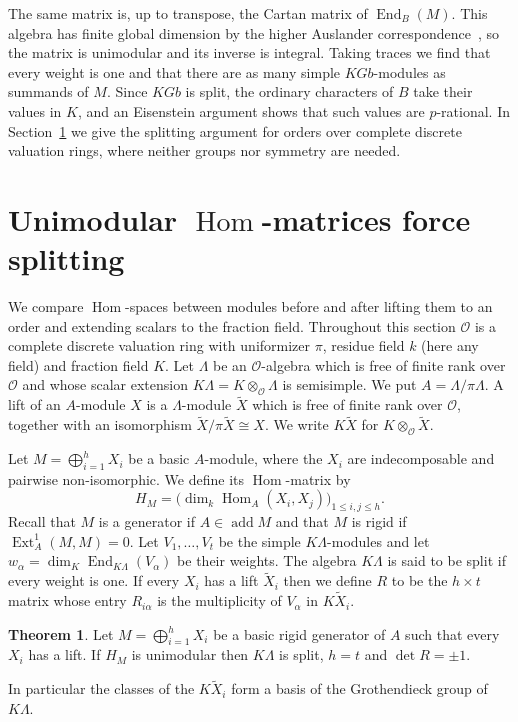 \documentclass[11pt,a4paper,reqno]{amsart}
\newcommand{\kk}{k}
\theoremstyle{definition}
\newtheorem{theorem}{Theorem}
\DeclareMathOperator{\Hom}{Hom}
\DeclareMathOperator{\End}{End}
\DeclareMathOperator{\Ext}{Ext}
\DeclareMathOperator{\add}{add}
\newcommand{\OO}{\mathcal O}
\begin{document}
The same matrix is, up to transpose, the Cartan matrix of
$\End_{B}(M)$.  This algebra has finite global dimension by the higher
Auslander correspondence~\cite{IyamaAC}, so the matrix is unimodular
and its inverse is integral.  Taking traces we find that every weight
is one and that there are as many simple $KGb$-modules as summands of
$M$.  Since $KGb$ is split, the ordinary characters of $B$ take their
values in $K$, and an Eisenstein argument shows that such values are
$p$-rational.  In Section~\ref{sec:lifting} we give the splitting
argument for orders over complete discrete valuation rings, where
neither groups nor symmetry are needed.

\section{Unimodular \texorpdfstring{$\Hom$}{Hom}-matrices force splitting}
\label{sec:lifting}
We compare $\Hom$-spaces between modules before and after lifting them
to an order and extending scalars to the fraction field.  Throughout
this section $\OO$ is a complete discrete valuation ring with
uniformizer $\pi$, residue field $\kk$ (here any field) and fraction
field $K$.  Let $\Lambda$ be an $\OO$-algebra which is free of finite
rank over $\OO$ and whose scalar extension
$K\Lambda=K\otimes_{\OO}\Lambda$ is semisimple.  We put
$A=\Lambda/\pi\Lambda$.  A lift of an $A$-module $X$ is a
$\Lambda$-module $\widetilde X$ which is free of finite rank over
$\OO$, together with an isomorphism
$\widetilde X/\pi\widetilde X\cong X$.  We write $K\widetilde X$ for
$K\otimes_{\OO}\widetilde X$.

Let $M=\bigoplus_{i=1}^{h}X_{i}$ be a basic $A$-module, where the
$X_{i}$ are indecomposable and pairwise non-isomorphic.  We define its
$\Hom$-matrix by
%
\begin{equation*}
  H_{M}=\bigl(\dim_{\kk}\Hom_{A}(X_{i},X_{j})\bigr)_{1\leq i,j\leq h}.
\end{equation*}
%
Recall that $M$ is a generator if $A\in\add M$ and that $M$ is rigid
if $\Ext_{A}^{1}(M,M)=0$.  Let $V_{1},\ldots,V_{t}$ be the simple
$K\Lambda$-modules and let
$w_{\alpha}=\dim_{K}\End_{K\Lambda}(V_{\alpha})$ be their weights.
The algebra $K\Lambda$ is said to be split if every weight is one.  If
every $X_{i}$ has a lift $\widetilde X_{i}$ then we define $R$ to be
the $h\times t$ matrix whose entry $R_{i\alpha}$ is the multiplicity
of $V_{\alpha}$ in $K\widetilde X_{i}$.

\begin{theorem}\label{thm:order}
  Let $M=\bigoplus_{i=1}^{h}X_{i}$ be a basic rigid generator of $A$
  such that every $X_{i}$ has a lift.  If $H_{M}$ is unimodular then
  $K\Lambda$ is split, $h=t$ and $\det R=\pm1$.
\end{theorem}
%
In particular the classes of the $K\widetilde X_{i}$ form a basis of
the Grothendieck group of $K\Lambda$.
\end{document}
